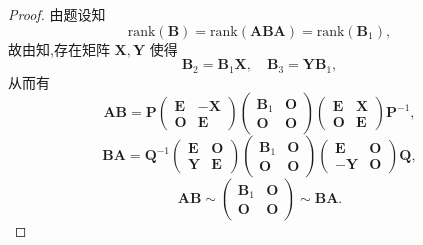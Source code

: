 \documentclass[../../main.tex]{subfiles}%
\begin{document}
\begin{proof}
由题设知
\[
\mathrm{rank}(\boldsymbol{B}) = \mathrm{rank}(\boldsymbol{ABA}) = \mathrm{rank}(\boldsymbol{B}_1),
\]
故由知,存在矩阵 \( \boldsymbol{X}, \boldsymbol{Y} \) 使得
\[
\boldsymbol{B}_2 = \boldsymbol{B}_1\boldsymbol{X}, \quad \boldsymbol{B}_3 = \boldsymbol{Y}\boldsymbol{B}_1,
\]
从而有
\[
\boldsymbol{AB} = \boldsymbol{P} \begin{pmatrix} \boldsymbol{E} & -\boldsymbol{X} \\ \boldsymbol{O} & \boldsymbol{E} \end{pmatrix} \begin{pmatrix} \boldsymbol{B}_1 & \boldsymbol{O} \\ \boldsymbol{O} & \boldsymbol{O} \end{pmatrix} \begin{pmatrix} \boldsymbol{E} & \boldsymbol{X} \\ \boldsymbol{O} & \boldsymbol{E} \end{pmatrix} \boldsymbol{P}^{-1},
\]
\[
\boldsymbol{BA} = \boldsymbol{Q}^{-1} \begin{pmatrix} \boldsymbol{E} & \boldsymbol{O} \\ \boldsymbol{Y} & \boldsymbol{E} \end{pmatrix} \begin{pmatrix} \boldsymbol{B}_1 & \boldsymbol{O} \\ \boldsymbol{O} & \boldsymbol{O} \end{pmatrix} \begin{pmatrix} \boldsymbol{E} & \boldsymbol{O} \\ -\boldsymbol{Y} & \boldsymbol{O} \end{pmatrix} \boldsymbol{Q},
\]
\[
\boldsymbol{AB} \sim \begin{pmatrix} \boldsymbol{B}_1 & \boldsymbol{O} \\ \boldsymbol{O} & \boldsymbol{O} \end{pmatrix} \sim \boldsymbol{BA}.
\]

\end{proof}
\end{document}
